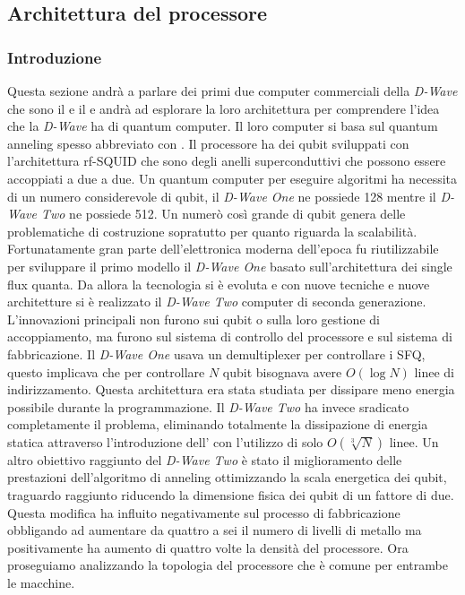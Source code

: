 \subsection{Architettura del processore}
\subsubsection{Introduzione}
Questa sezione andrà a parlare dei primi due computer commerciali della \textit{D-Wave} che sono il  e il  e andrà ad esplorare la loro architettura per comprendere l'idea che la \textit{D-Wave} ha di quantum computer. Il loro computer si basa sul quantum anneling spesso abbreviato con . Il processore ha dei qubit sviluppati con l'architettura rf-SQUID che sono degli anelli superconduttivi che possono essere accoppiati a due a due. Un quantum computer per eseguire algoritmi ha necessita di un numero considerevole di qubit, il \textit{D-Wave One} ne possiede 128 mentre il \textit{D-Wave Two} ne possiede 512. Un numerò così grande di qubit genera delle problematiche di costruzione sopratutto per quanto riguarda la scalabilità. Fortunatamente gran parte dell'elettronica moderna dell'epoca fu riutilizzabile per sviluppare il primo modello il \textit{D-Wave One} basato sull'architettura dei  single flux quanta. Da allora la tecnologia si è evoluta e con nuove tecniche e nuove architetture si è realizzato il \textit{D-Wave Two} computer di seconda generazione. L'innovazioni principali non furono sui qubit o sulla loro gestione di accoppiamento, ma furono sul sistema di controllo del processore e sul sistema di fabbricazione. Il \textit{D-Wave One} usava un demultiplexer per controllare i SFQ, questo implicava che per controllare $N$ qubit bisognava avere $O(\log{N})$ linee di indirizzamento. Questa architettura era stata studiata per dissipare meno energia possibile durante la programmazione. Il \textit{D-Wave Two} ha invece sradicato completamente il problema, eliminando totalmente la dissipazione di energia statica attraverso l'introduzione dell' con l'utilizzo di solo $O(\sqrt[3]{N})$ linee.
Un altro obiettivo raggiunto del \textit{D-Wave Two} è stato il miglioramento delle prestazioni dell'algoritmo di anneling ottimizzando la scala energetica dei qubit, traguardo raggiunto riducendo la dimensione fisica dei qubit di un fattore di due. Questa modifica ha influito negativamente sul processo di fabbricazione obbligando ad aumentare da quattro a sei il numero di livelli di metallo ma positivamente ha aumento di quattro volte la densità del processore. Ora proseguiamo analizzando la topologia del processore che è comune per entrambe le macchine.

